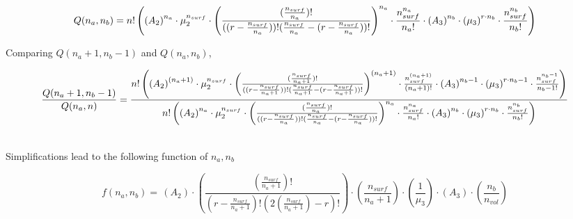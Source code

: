 \documentclass[10pt,letterpaper]{article}
\newcommand{\nads}[1]{\ensuremath{\frac{n_{surf}}{#1}}}
\newcommand{\nlp}[1]{\ensuremath{r-\nads{#1}}}
\newcommand{\myQ}[4]{
	\ensuremath{	
		n!
		\left(
		\left(
		A_2
		\right)^{#1}
		\cdot 
		\mu_{2}^{n_{surf}} 
		\cdot 
		\left(
		\frac{(#3)!}{(#4)!(#3-#4)!}
		\right)^{#1}
		\cdot
		\frac{n_{surf}^{#1}}{#1!}
		\cdot
		\left(
		A_3
		\right)^{#2}
		\cdot 
		\left(
		\mu_{3}
		\right)^{r\cdotp #2}
		\cdot
		\frac{
			n_{surf}^{#2}
		}{
			#2!
		}
		\right)}}
\newcommand{\myQcancel}[4]{
		\ensuremath{	
			\cancel{n!}
			\cdot
			\left(
			\left(
			A_2
			\right)^{~~\cancel{#1}}
			\cdot 
			\cancel{\mu_{2}^{n_{surf}}}
			\cdot 
			\left(
			\frac{\cancel{(#3)!}}{\cancel{(#4)!}\cancel{(#3-#4)!}}
			\right)^{~~\cancel{#1}}
			\cdot
			\frac{n_{surf}^{~~\cancel{#1}}}{\cancel{#1!}}
			\cdot
			\left(
			A_3
			\right)^{~~\cancel{#2}}
			\cdot 
			\left(
			\mu_{3}
			\right)^{~~\cancel{r\cdotp #2}}
			\cdot
			\frac{
				n_{vol}^{~~\cancel{#2}}
			}{
				\cancel{#2!}
			}
			\right)}}
\begin{document}
\begin{equation}
	Q(n_a,n_b)=\myQ{n_a}{n_b}{\nads{n_a}}{(\nlp{n_a})}
	\label{eq. Qab}
\end{equation}


\noindent Comparing $Q(n_a+1,n_b-1)$ and $Q(n_a,n_b)$, %

\begin{equation}
	\frac{Q(n_a+1,n_b-1)}{Q(n_a,n)}=
	\frac{
		\myQ{(n_a+1)}{n_b-1}{\nads{n_a+1}}{(\nlp{n_a+1})}
	}{
		\myQ{n_a}{n_b}{\nads{n_a}}{(\nlp{n_a})}
	}
	\label{eq. Qratio2}
\end{equation}

\text{}\\
\noindent Simplifications lead to the following function of $n_a,n_b$



\begin{equation}
f(n_a,n_b)=\,
\left(A_2\right)
\cdotp
\left(
\frac{
	\left(
	\frac{
		n_{surf}
	}{
		n_a+1				
	}
	\right)!
}{
	\left(
	r-
	\frac{
		n_{surf}
	}{
		n_a+1				
	}
	\right)!
	\left(
	2
		\left(
			\frac{
				n_{surf}
			}{
				n_a+1				
			}
		\right)	
	-
	r
	\right)!
} 
\right)
\cdotp
\left(
\frac{
	n_{surf}
}{
	n_a+1
}
\right)
\cdotp
\left(
\frac{
	1
}{
	\mu_{3}
}
\right)
\cdot
\left(
A_3
\right)
\cdot
\left(
\frac{
	n_{b}
}{
	n_{vol}	
} 
\right)
\label{fnanb}
\end{equation}
\end{document}

